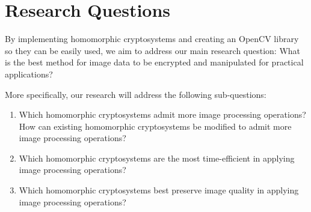 \section{Research Questions}

By implementing homomorphic cryptosystems and creating an OpenCV library so they can be easily used, we aim to address our main research question: What is the best method for image data to be encrypted and manipulated for practical applications?

More specifically, our research will address the following sub-questions:
\begin{enumerate}
	\item Which homomorphic cryptosystems admit more image processing operations? How can existing homomorphic cryptosystems be modified to admit more image processing operations?
	\item Which homomorphic cryptosystems are the most time-efficient in applying image processing operations?
	\item Which homomorphic cryptosystems best preserve image quality in applying image processing operations? 
\end{enumerate}
